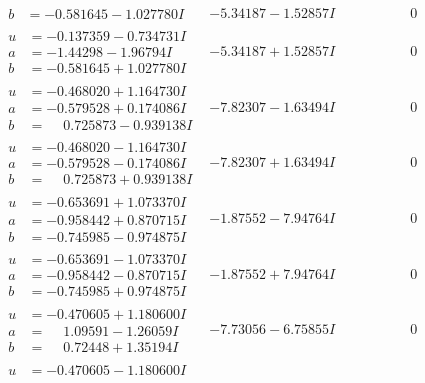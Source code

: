 \documentclass[1p]{elsarticle_modified}
\theoremstyle{definition}
\begin{document}
$$\begin{array}{c|c|c}
\begin{aligned}
b &= -0.581645 - 1.027780 I\end{aligned}
 & -5.34187 - 1.52857 I & \phantom{-0.000000 } 0 \\ \hline\begin{aligned}
u &= -0.137359 - 0.734731 I \\
a &= -1.44298 - 1.96794 I \\
b &= -0.581645 + 1.027780 I\end{aligned}
 & -5.34187 + 1.52857 I & \phantom{-0.000000 } 0 \\ \hline\begin{aligned}
u &= -0.468020 + 1.164730 I \\
a &= -0.579528 + 0.174086 I \\
b &= \phantom{-}0.725873 - 0.939138 I\end{aligned}
 & -7.82307 - 1.63494 I & \phantom{-0.000000 } 0 \\ \hline\begin{aligned}
u &= -0.468020 - 1.164730 I \\
a &= -0.579528 - 0.174086 I \\
b &= \phantom{-}0.725873 + 0.939138 I\end{aligned}
 & -7.82307 + 1.63494 I & \phantom{-0.000000 } 0 \\ \hline\begin{aligned}
u &= -0.653691 + 1.073370 I \\
a &= -0.958442 + 0.870715 I \\
b &= -0.745985 - 0.974875 I\end{aligned}
 & -1.87552 - 7.94764 I & \phantom{-0.000000 } 0 \\ \hline\begin{aligned}
u &= -0.653691 - 1.073370 I \\
a &= -0.958442 - 0.870715 I \\
b &= -0.745985 + 0.974875 I\end{aligned}
 & -1.87552 + 7.94764 I & \phantom{-0.000000 } 0 \\ \hline\begin{aligned}
u &= -0.470605 + 1.180600 I \\
a &= \phantom{-}1.09591 - 1.26059 I \\
b &= \phantom{-}0.72448 + 1.35194 I\end{aligned}
 & -7.73056 - 6.75855 I & \phantom{-0.000000 } 0 \\ \hline\begin{aligned}
u &= -0.470605 - 1.180600 I \\

\end{aligned}
\end{array}$$
\end{document}
